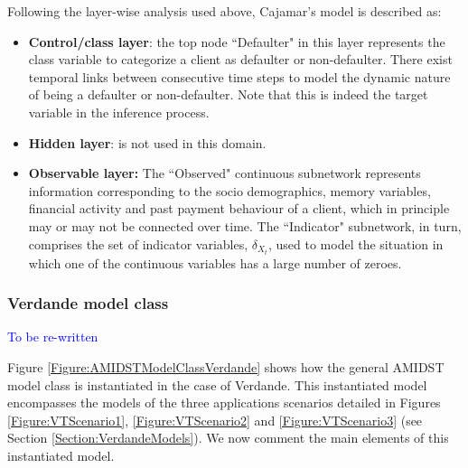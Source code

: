 Following the layer-wise analysis used above, Cajamar's model is described as:
\begin{itemize}

\item \textbf{Control/class layer}: the top node ``Defaulter" in this layer represents the class variable to categorize a client as defaulter or non-defaulter. There exist temporal links between consecutive time steps to model the dynamic nature of being a defaulter or non-defaulter. Note that this is indeed the target variable in the inference process.

\item \textbf{Hidden layer}: is not used in this domain.

\item \textbf{Observable layer:} The ``Observed" continuous subnetwork represents information corresponding to the socio demographics, memory variables, financial activity and past payment behaviour of a client, which in principle may or may not be connected over time. The ``Indicator" subnetwork, in turn, comprises the set of indicator variables, $\delta_{X_t}$, used to model the situation in which one of the continuous variables has a large number of zeroes.

\end{itemize}



\subsubsection{Verdande model class}\label{verdandeAMIDSTModels}
\textcolor{blue}{To be re-written}

Figure \ref{Figure:AMIDSTModelClassVerdande} shows how the general AMIDST model class is instantiated in the case of Verdande. This instantiated model encompasses the models of the three applications scenarios detailed in Figures \ref{Figure:VTScenario1}, \ref{Figure:VTScenario2} and \ref{Figure:VTScenario3}  (see Section \ref{Section:VerdandeModels}).  We now comment the main elements of this instantiated model.


